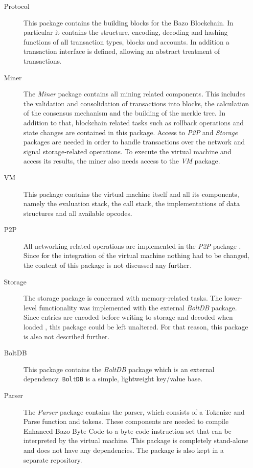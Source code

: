 \begin{description}
	\item[Protocol] This package contains the building blocks for the Bazo Blockchain. In particular it contains the structure, encoding, decoding and hashing functions of all transaction types, blocks and accounts. In addition a transaction interface is defined, allowing an abstract treatment of transactions. \cite{ba_miner}
	\item[Miner] The \textit{Miner} package contains all mining related components. This includes the validation and consolidation of transactions into blocks, the calculation of the consensus mechanism and the building of the merkle tree. In addition to that, blockchain related tasks such as rollback operations and state changes are contained in this package. Access to \textit{P2P} and \textit{Storage} packages are needed in order to handle transactions over the network and signal storage-related operations. \cite{ba_miner} To execute the virtual machine and access its results, the miner also needs access to the \textit{VM} package.
	\item[VM] This package contains the virtual machine itself and all its components, namely the evaluation stack, the call stack, the implementations of data structures and all available opcodes.
	\item[P2P] All networking related operations are implemented in the \textit{P2P} package \cite{ba_miner}. Since for the integration of the virtual machine nothing had to be changed, the content of this package is not discussed any further.
	\item[Storage] The storage package is concerned with memory-related tasks. The lower-level functionality was implemented with the external \textit{BoltDB} package. Since entries are encoded before writing to storage and decoded when loaded \cite{ba_miner}, this package could be left unaltered. For that reason, this package is also not described further.
	\item[BoltDB] This package contains the \textit{BoltDB} package which is an external dependency. \texttt{BoltDB} is a simple, lightweight key/value base. \cite{ba_miner}
	\item[Parser] The \textit{Parser} package contains the parser, which consists of a Tokenize and Parse function and tokens. These components are needed to compile \flqq Enhanced Bazo Byte Code\frqq{ } to a byte code instruction set that can be interpreted by the virtual machine. This package is completely stand-alone and does not have any dependencies. The package is also kept in a separate repository.
\end{description}

